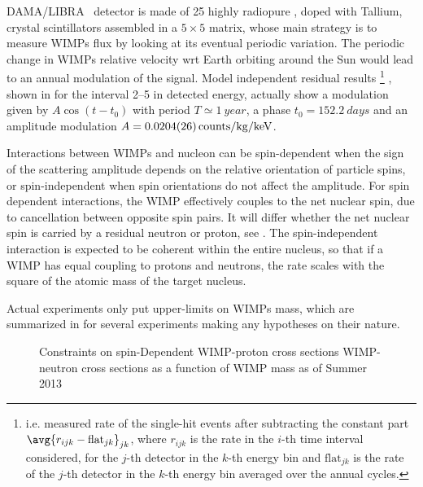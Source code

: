 DAMA/LIBRA~\cite{damalibra} detector is made of 25 highly radiopure , doped with Tallium, crystal scintillators assembled in a $5\times5$ matrix, whose main strategy is to measure WIMPs flux by looking at its eventual periodic variation. The periodic change in WIMPs relative velocity wrt Earth orbiting around the Sun would lead to an annual modulation of the signal. Model independent residual results
\footnote{i.e. measured rate of the single-hit events after subtracting the constant part $\avg{r_{ijk}-\text{flat}_{jk}}_{jk}$, where $r_{ijk}$ is the rate in the $i$-th time interval considered, for the $j$-th detector in the $k$-th energy bin and $\text{flat}_{jk}$ is the rate of the $j$-th detector in the $k$-th energy bin averaged over the annual cycles.}
, shown in \Fig{\ref{fig:damalibra}} for the interval \SIrange{2}{5}{\kev} in detected energy, actually show a modulation given by $A\cos{(t-t_0)}$ with period $T\simeq \SI{1}{year}$, a phase $t_0=\SI{152.2}{days}$ and an amplitude modulation $A =\SI{0.0204\pm0.0026}{counts/\kg/\keV}$.

Interactions between WIMPs and nucleon can be spin-dependent when the sign of the scattering amplitude depends on the relative orientation of particle spins, or spin-independent when spin orientations do not affect the amplitude. For spin dependent interactions, the WIMP effectively couples to the net nuclear spin, due to cancellation between opposite spin pairs. It will differ whether the net nuclear spin is carried by a residual neutron or proton, see \Fig{\ref{fig:WIMPcsSD}}. The spin-independent interaction is expected to be coherent within the entire nucleus, so that if a WIMP has equal coupling to protons and neutrons, the rate scales with the square of the atomic mass of the target nucleus. 

Actual experiments only put upper-limits on WIMPs mass, which are summarized in \Fig{\ref{fig:WIMPcs}} for several experiments making any hypotheses on their nature.

\begin{figure}[p]
\centering
{}\quad
{}

\caption{Constraints on spin-Dependent WIMP-proton cross sections WIMP-neutron cross sections  as a function of WIMP
mass as of Summer 2013}
\label{fig:WIMPcsSD}
\end{figure}


